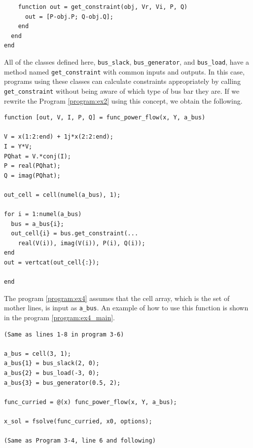 \documentclass[graybox, envcountchap]{svmult}
\begin{document}
\begin{example}
\begin{PROGRAMA}[count,title={bus\_load.m}]
\begin{verbatim}
    function out = get_constraint(obj, Vr, Vi, P, Q)
      out = [P-obj.P; Q-obj.Q];
    end
  end
end
\end{verbatim}
\end{PROGRAMA}

\smallskip

All of the classes defined here, \verb|bus_slack|, \verb|bus_generator|, and \verb|bus_load|, have a method named \verb|get_constraint| with common inputs and outputs.
In this case, programs using these classes can calculate constraints appropriately by calling \verb|get_constraint| without being aware of which type of bus bar they are.
If we rewrite the Program \nobreak\ref{program:ex2} using this concept, we obtain the following.


\smallskip
\begin{PROGRAMA}[count, title={func\_power\_flow.m}]\label{program:ex4}%
\begin{verbatim}
function [out, V, I, P, Q] = func_power_flow(x, Y, a_bus)

V = x(1:2:end) + 1j*x(2:2:end);
I = Y*V;
PQhat = V.*conj(I);
P = real(PQhat);
Q = imag(PQhat);

out_cell = cell(numel(a_bus), 1);

for i = 1:numel(a_bus)
  bus = a_bus{i};
  out_cell{i} = bus.get_constraint(...
    real(V(i)), imag(V(i)), P(i), Q(i));
end
out = vertcat(out_cell{:});

end
\end{verbatim}
\end{PROGRAMA}

The program \nobreak\ref{program:ex4} assumes that the cell array, which is the set of mother lines, is input as \verb|a_bus|.
An example of how to use this function is shown in the program \nobreak\ref{program:ex4_main}.

\smallskip
\begin{PROGRAMA}[count,title={main\_ex4.m}]\label{program:ex4_main}
\begin{verbatim}
(Same as lines 1-8 in program 3-6)

a_bus = cell(3, 1);
a_bus{1} = bus_slack(2, 0);
a_bus{2} = bus_load(-3, 0);
a_bus{3} = bus_generator(0.5, 2);

func_curried = @(x) func_power_flow(x, Y, a_bus);

x_sol = fsolve(func_curried, x0, options);

(Same as Program 3-4, line 6 and following)
\end{verbatim}
\end{PROGRAMA}


\end{example}
\end{document}
